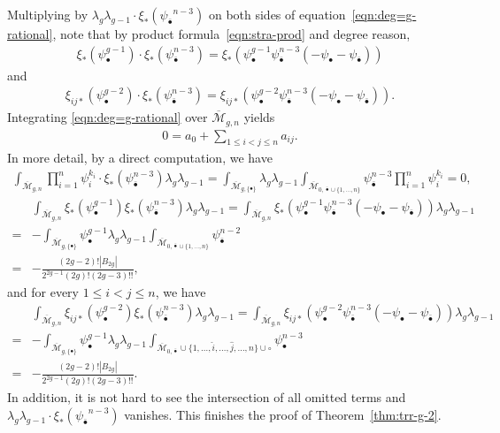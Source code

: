\documentclass[12pt,reqno]{amsart}
\theoremstyle{plain}
\theoremstyle{definition}
\theoremstyle{remark}
\begin{document}
Multiplying by $\lambda_g\lambda_{g-1}\cdot\xi_{*}({\psi_{\bar{\bullet}}}^{n-3})$ on both sides of equation~\eqref{eqn:deg=g-rational},
note that by product formula~\eqref{eqn:stra-prod} and degree reason,
\begin{align*}
\xi_{*}(\psi_{\bullet}^{g-1})\cdot\xi_{*}(\psi_{\bar{\bullet}}^{n-3})=\xi_{*}(\psi_{\bullet}^{g-1}\psi_{\bar{\bullet}}^{n-3}(-\psi_{\bullet}-\psi_{\bar{\bullet}}))   
\end{align*}
and
\begin{align*}
\xi_{ij*}(\psi_{\bullet}^{g-2})\cdot\xi_{*}(\psi_{\bar{\bullet}}^{n-3})=\xi_{ij*}(\psi_{\bullet}^{g-2}\psi_{\bar{\bullet}}^{n-3}(-\psi_{\bullet}-\psi_{\bar{\bullet}})).    
\end{align*}
Integrating \eqref{eqn:deg=g-rational} over $\overline{\mathcal{M}}_{g,n}$ yields
\begin{align*}
  0=a_0+\sum_{1\leq i<j\leq n}a_{ij}.
\end{align*}
In more detail, by a direct computation, we have
\begin{align*}
\int_{\overline{\mathcal{M}}_{g,n}}\prod_{i=1}^{n}\psi_{i}^{k_i} \cdot \xi_{*}(\psi_{\bar{\bullet}}^{n-3})\lambda_{g}\lambda_{g-1}=\int_{\overline{\mathcal{M}}_{g,\{\bullet\}}}\lambda_{g}\lambda_{g-1} 
\int_{\overline{\mathcal{M}}_{0,\bar{\bullet}\cup\{1,\dots,n\}}}\psi_{\bar{\bullet}}^{n-3}\prod_{i=1}^{n}\psi_{i}^{k_i}=0,
\end{align*}
\begin{align*}
&\int_{\overline{\mathcal{M}}_{g,n}}
\xi_{*}(\psi_{\bullet}^{g-1})\xi_{*}(\psi_{\bar{\bullet}}^{n-3})\lambda_{g}\lambda_{g-1}=\int_{\overline{\mathcal{M}}_{g,n}}
\xi_{*}(\psi_{\bullet}^{g-1}\psi_{\bar{\bullet}}^{n-3}(-\psi_{\bullet}-\psi_{\bar{\bullet}}))\lambda_{g}\lambda_{g-1}
\\=&-\int_{\overline{\mathcal{M}}_{g,\{\bullet\}}}\psi_{\bullet}^{g-1}\lambda_{g}\lambda_{g-1}\int_{\overline{\mathcal{M}}_{0,\bar{\bullet}\cup\{1,\dots,n\}}}\psi_{\bar{\bullet}}^{n-2}
\\=&-\frac{(2g-2)!
|B_{2g}|}{2^{2g-1}(2g)!(2g-3)!!},
\end{align*}
and for every $1 \le i < j \le n$, we have
\begin{align*}
&\int_{\overline{\mathcal{M}}_{g,n}}\xi_{ij*}(\psi_{\bullet}^{g-2})\xi_{*}(\psi_{\bar{\bullet}}^{n-3})\lambda_{g}\lambda_{g-1}
=\int_{\overline{\mathcal{M}}_{g,n}}\xi_{ij*}(\psi_{\bullet}^{g-2}\psi_{\bar{\bullet}}^{n-3}(-\psi_{\bullet}-\psi_{\bar{\bullet}}))\lambda_{g}\lambda_{g-1}
\\=&-\int_{\overline{\mathcal{M}}_{g,\{\bullet\}}}\psi_{\bullet}^{g-1}\lambda_{g}\lambda_{g-1}\int_{\overline{\mathcal{M}}_{0,\bar{\bullet}}\cup\{1,\dots,\hat{i},\dots,\hat{j},\dots,n\}\cup\circ}\psi_{\bullet}^{n-3}
\\=&-\frac{(2g-2)!|B_{2g}|}{2^{2g-1}(2g)!(2g-3)!!}.
\end{align*}
In addition, it is not hard to see 
the intersection of all omitted terms and $\lambda_g\lambda_{g-1}\cdot\xi_{*}({\psi_{\bar{\bullet}}}^{n-3})$ vanishes.
This finishes the proof of Theorem~\ref{thm:trr-g-2}.
\end{document}
